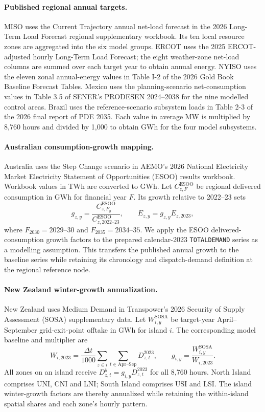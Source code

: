 \documentclass[pdflatex,sn-nature]{sn-jnl}
\begin{document}
\paragraph{Published regional annual targets.}
MISO uses the Current Trajectory annual net-load forecast in the 2026 Long-Term Load Forecast regional supplementary workbook. Its ten local resource zones are aggregated into the six model groups. ERCOT uses the 2025 ERCOT-adjusted hourly Long-Term Load Forecast; the eight weather-zone net-load columns are summed over each target year to obtain annual energy. NYISO uses the eleven zonal annual-energy values in Table I-2 of the 2026 Gold Book Baseline Forecast Tables. Mexico uses the planning-scenario net-consumption values in Table 3.5 of SENER's PRODESEN 2024--2038 for the nine modelled control areas. Brazil uses the reference-scenario subsystem loads in Table 2-3 of the 2026 final report of PDE 2035. Each value in average MW is multiplied by 8,760 hours and divided by 1,000 to obtain GWh for the four model subsystems.

\paragraph{Australian consumption-growth mapping.}
Australia uses the Step Change scenario in AEMO's 2026 National Electricity Market Electricity Statement of Opportunities (ESOO) results workbook. Workbook values in TWh are converted to GWh. Let $C_{z,F}^{\mathrm{ESOO}}$ be regional delivered consumption in GWh for financial year $F$. Its growth relative to 2022--23 sets
\begin{equation}
g_{z,y}=\frac{C_{z,F_y}^{\mathrm{ESOO}}}{C_{z,2022\text{--}23}^{\mathrm{ESOO}}},\qquad
E_{z,y}=g_{z,y}E_{z,2023},
\label{eq:australia-demand}
\end{equation}
where $F_{2030}=2029\text{--}30$ and $F_{2035}=2034\text{--}35$. We apply the ESOO delivered-consumption growth factors to the prepared calendar-2023 \texttt{TOTALDEMAND} series as a modelling assumption. This transfers the published annual growth to the baseline series while retaining its chronology and dispatch-demand definition at the regional reference node.

\paragraph{New Zealand winter-growth annualization.}
New Zealand uses Medium Demand in Transpower's 2026 Security of Supply Assessment (SOSA) supplementary data. Let $W_{i,y}^{\mathrm{SOSA}}$ be target-year April--September grid-exit-point offtake in GWh for island $i$. The corresponding model baseline and multiplier are
\begin{equation}
W_{i,2023}=\frac{\Delta t}{1000}\sum_{z\in i}\sum_{t\in\mathrm{Apr\text{--}Sep}}D_{z,t}^{2023},\qquad
g_{i,y}=\frac{W_{i,y}^{\mathrm{SOSA}}}{W_{i,2023}}.
\label{eq:new-zealand-demand}
\end{equation}
All zones on an island receive $D_{z,t}^{y}=g_{i,y}D_{z,t}^{2023}$ for all 8,760 hours. North Island comprises UNI, CNI and LNI; South Island comprises USI and LSI. The island winter-growth factors are thereby annualized while retaining the within-island spatial shares and each zone's hourly pattern.
\end{document}
